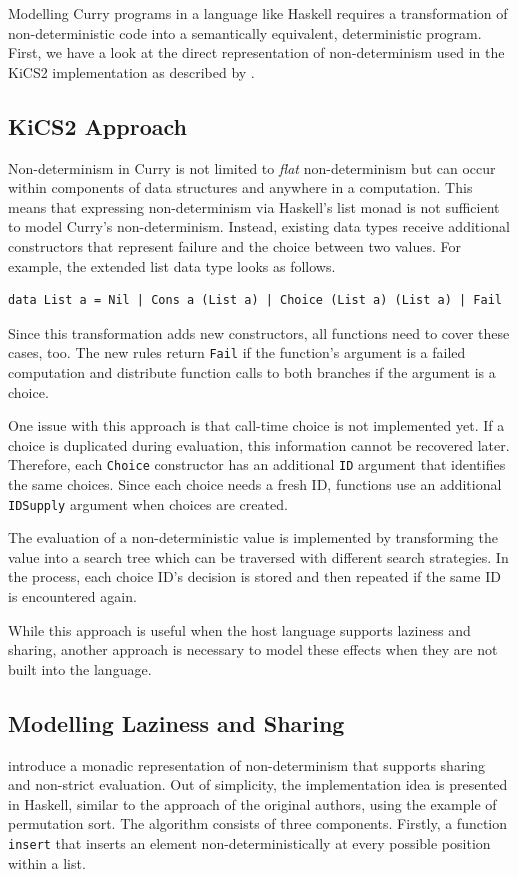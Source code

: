 \documentclass[a4paper, 11pt, fleqn, twoside]{scrreprt}
\newcommand{\todo}[1]{\marginpar{\textbf{TODO:} #1}}
\newcommand{\hinl}[1]{\texttt{#1}}
\begin{document}
Modelling Curry programs in a language like Haskell requires a transformation of non-deterministic code into a semantically equivalent, deterministic program.
First, we have a look at the direct representation of non-determinism used in the KiCS2 implementation as described by \citet{brassel2011kics2}.

\subsection{KiCS2 Approach}
Non-determinism in Curry is not limited to \textit{flat} non-determinism but can occur within components of data structures and anywhere in a computation.
This means that expressing non-determinism via Haskell's list monad is not sufficient to model Curry's non-determinism.
\todo{Example}
Instead, existing data types receive additional constructors that represent failure and the choice between two values.
For example, the extended list data type looks as follows.

\begin{verbatim}
data List a = Nil | Cons a (List a) | Choice (List a) (List a) | Fail
\end{verbatim}

Since this transformation adds new constructors, all functions need to cover these cases, too.
The new rules return \hinl{Fail} if the function's argument is a failed computation and distribute function calls to both branches if the argument is a choice.

One issue with this approach is that call-time choice is not implemented yet.
If a choice is duplicated during evaluation, this information cannot be recovered later.
Therefore, each \hinl{Choice} constructor has an additional \hinl{ID} argument that identifies the same choices.
Since each choice needs a fresh ID, functions use an additional \hinl{IDSupply} argument when choices are created.

The evaluation of a non-deterministic value is implemented by transforming the value into a search tree which can be traversed with different search strategies.
In the process, each choice ID's decision is stored and then repeated if the same ID is encountered again.

While this approach is useful when the host language supports laziness and sharing, another approach is necessary to model these effects when they are not built into the language.

\subsection{Modelling Laziness and Sharing}
\label{subsec:monadicLifting}
\citet{fischer2009purely} introduce a monadic representation of non-determinism that supports sharing and non-strict evaluation.
Out of simplicity, the implementation idea is presented in Haskell, similar to the approach of the original authors, using the example of permutation sort.
The algorithm consists  of three components.
Firstly, a function \hinl{insert} that inserts an element non-deterministically at every possible position within a list.
\end{document}
